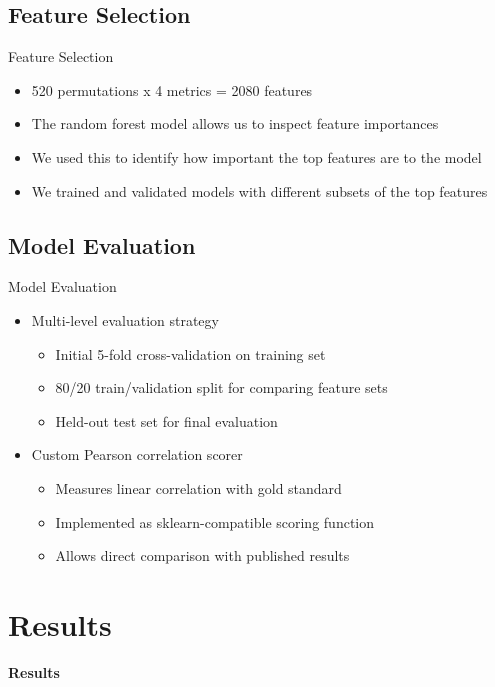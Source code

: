\documentclass{beamer}
\begin{document}
\subsection{Feature Selection}
\begin{frame}{Feature Selection}
    \begin{itemize}
        \item 520 permutations x 4 metrics = 2080 features
        \item The random forest model allows us to inspect feature importances
        \item We used this to identify how important the top features are to the model
        \item We trained and validated models with different subsets of the top features
    \end{itemize}
\end{frame}

\subsection{Model Evaluation}
\begin{frame}{Model Evaluation}
    \begin{itemize}
        \item Multi-level evaluation strategy
        \begin{itemize}
            \item Initial 5-fold cross-validation on training set
            \item 80/20 train/validation split for comparing feature sets
            \item Held-out test set for final evaluation
        \end{itemize}
        \item Custom Pearson correlation scorer
        \begin{itemize}
            \item Measures linear correlation with gold standard
            \item Implemented as sklearn-compatible scoring function
            \item Allows direct comparison with published results
        \end{itemize}
    \end{itemize}
\end{frame}

\section{Results}
\begin{frame}
    \begin{center}
        \Large \textbf{Results}
    \end{center}
\end{frame}
\end{document}

